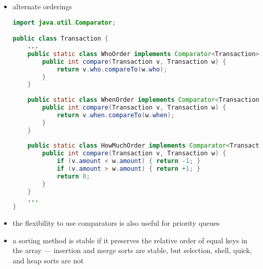\documentclass[8pt,a4paper,compress]{beamer}
\begin{document}
\begin{frame}[fragile]
\begin{itemize}
\item alternate orderings
\begin{lstlisting}[language=Java]
import java.util.Comparator;

public class Transaction {  
    ...
    public static class WhoOrder implements Comparator<Transaction> {
        public int compare(Transaction v, Transaction w) { 
            return v.who.compareTo(w.who); 
        }        
    }
    
    public static class WhenOrder implements Comparator<Transaction> {
        public int compare(Transaction v, Transaction w) { 
            return v.when.compareTo(w.when); 
        }
    }
    
    public static class HowMuchOrder implements Comparator<Transaction> {
        public int compare(Transaction v, Transaction w) {
            if (v.amount < w.amount) { return -1; }
            if (v.amount > w.amount) { return +1; }
            return 0;
        }
    }
    ...
}
\end{lstlisting}

\item the flexibility to use comparators is also useful for priority queues

\item a sorting method is stable if it preserves the relative order of equal keys in the array --- insertion and merge sorts are stable, but selection, shell, quick, and heap sorts are not
\end{itemize}
\end{frame}
\end{document}
